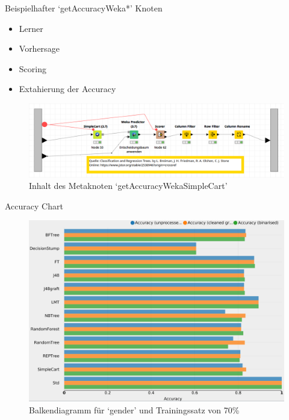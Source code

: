 \documentclass[
	handout,
  	aspectratio=169
]{beamer}
\begin{document}
			\begin{frame}{Beispielhafter `getAccuracyWeka*' Knoten}		
				\begin{itemize}
					\item Lerner	
					\item Vorhersage
					\item Scoring
					\item Extahierung der Accuracy
				\end{itemize}
				\begin{center}					
					\begin{figure}[h]
						\includegraphics[scale=0.25]{../pictures/trees-workflow-weka-example.png}
						\caption{Inhalt des Metaknoten `getAccuracyWekaSimpleCart'}		
					\end{figure}	
				\end{center}	
			\end{frame}
			
			\begin{frame}{Accuracy Chart}		
				\begin{center}					
					\begin{figure}[h]
						\includegraphics[scale=0.15]{../pictures/chart_accuracy.png}
						\caption{Balkendiagramm für `gender' und Trainingssatz von 70\%}		
					\end{figure}	
				\end{center}	
			\end{frame}
			
			
\end{document}
